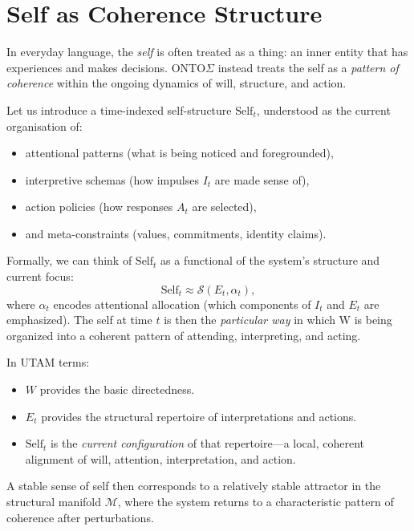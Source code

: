 \documentclass[12pt,a4paper]{report}
\newcommand{\Will}{W}
\begin{document}
\section{Self as Coherence Structure}

In everyday language, the \emph{self} is often treated as a thing: an inner entity that has experiences and makes decisions. ONTO$\Sigma$ instead treats the self as a \emph{pattern of coherence} within the ongoing dynamics of will, structure, and action.

Let us introduce a time-indexed self-structure \(\text{Self}_t\), understood as the current organisation of:

\begin{itemize}[leftmargin=2em]
    \item attentional patterns (what is being noticed and foregrounded),
    \item interpretive schemas (how impulses \(I_t\) are made sense of),
    \item action policies (how responses \(A_t\) are selected),
    \item and meta-constraints (values, commitments, identity claims).
\end{itemize}

Formally, we can think of \(\text{Self}_t\) as a functional of the system's structure and current focus:
\[
    \text{Self}_t \approx \mathcal{S}(E_t, \alpha_t),
\]
where \(\alpha_t\) encodes attentional allocation (which components of \(I_t\) and \(E_t\) are emphasized). The self at time \(t\) is then the \emph{particular way} in which \Will{} is being organized into a coherent pattern of attending, interpreting, and acting.

In UTAM terms:

\begin{itemize}[leftmargin=2em]
    \item \(\Will\) provides the basic directedness.
    \item \(E_t\) provides the structural repertoire of interpretations and actions.
    \item \(\text{Self}_t\) is the \emph{current configuration} of that repertoire---a local, coherent alignment of will, attention, interpretation, and action.
\end{itemize}

A stable sense of self then corresponds to a relatively stable attractor in the structural manifold \(\mathcal{M}\), where the system returns to a characteristic pattern of coherence after perturbations.
\end{document}
